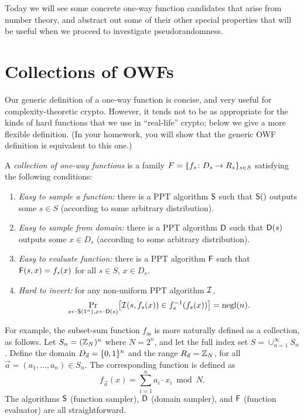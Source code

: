 \documentclass[11pt]{article}
\begin{document}
\thispagestyle{fancy}           %


Today we will see some concrete one-way function candidates that arise
from number theory, and abstract out some of their other special
properties that will be useful when we proceed to investigate
pseudorandomness.

\section{Collections of OWFs}
\label{sec:coll-owfs-vari}

Our generic definition of a one-way function is concise, and very
useful for complexity-theoretic crypto.  However, it tends not to be
as appropriate for the kinds of hard functions that we use in
``real-life'' crypto; below we give a more flexible definition.  (In
your homework, you will show that the generic OWF definition is
equivalent to this one.)

\begin{definition}
  \label{def:collection-owfs}
  A \emph{collection of one-way functions} is a family $F = \{
    f_{s} \colon D_{s} \to R_{s} \}_{s \in S}$ satisfying the following
  conditions:
  \begin{enumerate}
  \item \emph{Easy to sample a function:} there is a PPT algorithm
    $\mathsf{S}$ such that $\mathsf{S}()$ outputs some $s \in S$
    (according to some arbitrary distribution).
  \item \emph{Easy to sample from domain:} there is a PPT algorithm
    $\mathsf{D}$ such that $\mathsf{D}(s)$ outputs some $x \in D_{s}$
    (according to some arbitrary distribution).
  \item \emph{Easy to evaluate function:} there is a PPT algorithm
    $\mathsf{F}$ such that $\mathsf{F}(s,x)=f_{s}(x)$ for all $s \in S$,
    $x \in D_{s}$.
  \item \emph{Hard to invert:} for any non-uniform PPT algorithm
    $\mathcal{I}$, \[ \Pr_{s \gets \algo{S}(1^n), x \gets \algo{D}(s)}
    \bracks*{\Inv(s,f_{s}(x)) \in f_{s}^{-1}(f_{s}(x))} = \negl(n). \]
  \end{enumerate}
\end{definition}

For example, the subset-sum function $f_{\text{ss}}$ is more naturally
defined as a collection, as follows.  Let $S_{n} = (\mathbb{Z}_{N})^{n}$ where
$N=2^{n}$, and let the full index set $S = \cup_{n=1}^{\infty} S_{n}$.
Define the domain $D_{\vec{a}} = \{0,1\}^{n}$ and the range $R_{\vec{a}}
= \mathbb{Z}_{N}$, for all $\vec{a} = (a_{1}, \ldots, a_{n}) \in S_{n}$. The
corresponding function is defined as \[ f_{\vec{a}}(x) =
\sum_{i=1}^{n} a_{i} \cdot x_{i} \bmod N. \] The algorithms $\mathsf{S}$
(function sampler), $\mathsf{D}$ (domain sampler), and $\mathsf{F}$
(function evaluator) are all straightforward.
\end{document}
